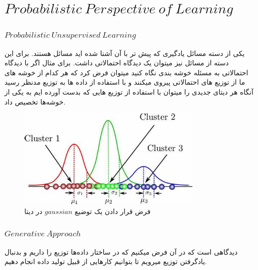 \documentclass[12pt]{article}
\begin{document}
\fontsize{12pt}{14pt}\selectfont





\section*{$Probabilistic\:Perspective\:of\:
Learning$}
\subsubsection*{$Probabilistic\:Unsupervised\:Learning$}
یکی از دسته مسائل یادگیری که پیش تر با آن آشنا شده اید مسائل
هستند. برای این دسته از مسائل نیز میتوان یک دیدگاه احتمالاتی داشت. برای مثال اگر با دیدگاه احتمالاتی به مسئله خوشه بندی نگاه کنید میتوان فرض کرد که هر کدام از خوشه های ما از توزیع های احتمالاتی پیروی میکنند و با استفاده از داده ها به توزیع مدنظر رسید آنگاه هر دیتای جدیدی را میتوان با استفاده از توزیع هایی که بدست آورده ایم به یکی از خوشه‌ها تخصیص داد.

\begin{figure}[h]
    \centering
    \includegraphics[width= 0.8\textwidth]{figs/GaussianMixtureModel.jpeg}
    \caption{فرض قرار دادن یک توضیع $gaussian$ در دیتا}
    \label{fig:gaussian_mixture_model}
\end{figure}

\subsubsection*{$Generative\:Approach$}
دیدگاهی است که در آن فرض میکنیم که در ساختار داده‌ها توزیع 
را داریم و بدنبال یادگرفتن توزیع 
میرویم تا بتوانیم کارهایی از قبیل تولید داده انجام دهیم. 
\href{http://cs231n.stanford.edu/slides/2017/cs231n_2017_lecture13.pdf}{}
\end{document}
